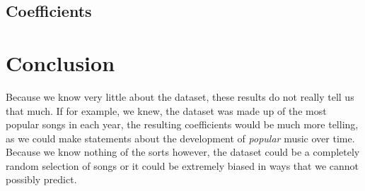 \documentclass{article}
\begin{document}
\subsection{Coefficients}

\section{Conclusion}

Because we know very little about the dataset, these results do not really tell us that much. If for example, we knew, the dataset was made up of the most popular songs in each year, the resulting coefficients would be much more telling, as we could make statements about the development of \emph{popular} music over time. Because we know nothing of the sorts however, the dataset could be a completely random selection of songs or it could be extremely biased in ways that we cannot possibly predict. 

 
\end{document}
